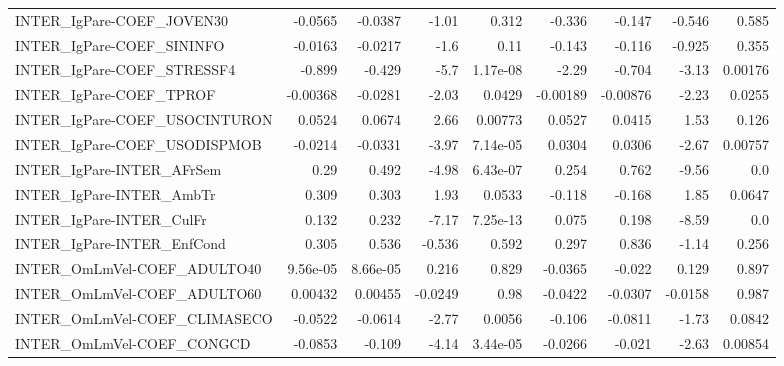 \begin{tabular}{lrrrrrrrr}
INTER\_IgPare-COEF\_JOVEN30             &     -0.0565 &      -0.0387 &   -1.01 &    0.312 &     -0.336 &      -0.147 &       -0.546 &         0.585 \\
INTER\_IgPare-COEF\_SININFO             &     -0.0163 &      -0.0217 &    -1.6 &     0.11 &     -0.143 &      -0.116 &       -0.925 &         0.355 \\
INTER\_IgPare-COEF\_STRESSF4            &      -0.899 &       -0.429 &    -5.7 & 1.17e-08 &      -2.29 &      -0.704 &        -3.13 &       0.00176 \\
INTER\_IgPare-COEF\_TPROF               &    -0.00368 &      -0.0281 &   -2.03 &   0.0429 &   -0.00189 &    -0.00876 &        -2.23 &        0.0255 \\
INTER\_IgPare-COEF\_USOCINTURON         &      0.0524 &       0.0674 &    2.66 &  0.00773 &     0.0527 &      0.0415 &         1.53 &         0.126 \\
INTER\_IgPare-COEF\_USODISPMOB          &     -0.0214 &      -0.0331 &   -3.97 & 7.14e-05 &     0.0304 &      0.0306 &        -2.67 &       0.00757 \\
INTER\_IgPare-INTER\_AFrSem             &        0.29 &        0.492 &   -4.98 & 6.43e-07 &      0.254 &       0.762 &        -9.56 &           0.0 \\
INTER\_IgPare-INTER\_AmbTr              &       0.309 &        0.303 &    1.93 &   0.0533 &     -0.118 &      -0.168 &         1.85 &        0.0647 \\
INTER\_IgPare-INTER\_CulFr              &       0.132 &        0.232 &   -7.17 & 7.25e-13 &      0.075 &       0.198 &        -8.59 &           0.0 \\
INTER\_IgPare-INTER\_EnfCond            &       0.305 &        0.536 &  -0.536 &    0.592 &      0.297 &       0.836 &        -1.14 &         0.256 \\
INTER\_OmLmVel-COEF\_ADULTO40           &    9.56e-05 &     8.66e-05 &   0.216 &    0.829 &    -0.0365 &      -0.022 &        0.129 &         0.897 \\
INTER\_OmLmVel-COEF\_ADULTO60           &     0.00432 &      0.00455 & -0.0249 &     0.98 &    -0.0422 &     -0.0307 &      -0.0158 &         0.987 \\
INTER\_OmLmVel-COEF\_CLIMASECO          &     -0.0522 &      -0.0614 &   -2.77 &   0.0056 &     -0.106 &     -0.0811 &        -1.73 &        0.0842 \\
INTER\_OmLmVel-COEF\_CONGCD             &     -0.0853 &       -0.109 &   -4.14 & 3.44e-05 &    -0.0266 &      -0.021 &        -2.63 &       0.00854 \\

\end{tabular}
